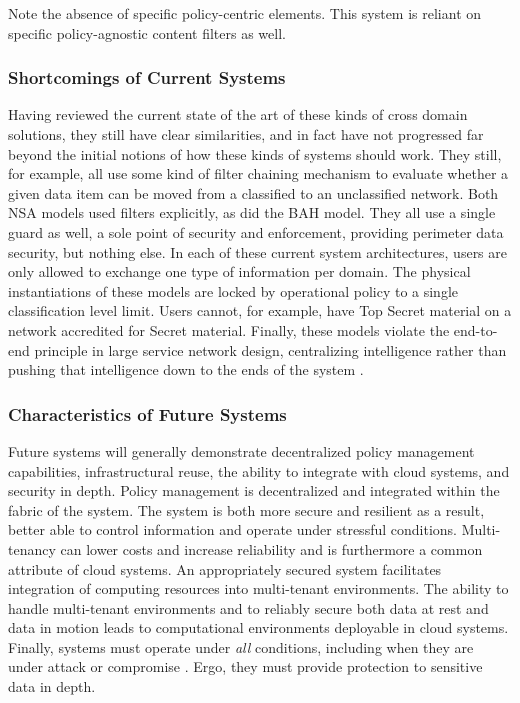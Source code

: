 \documentclass[12pt,letterpaper]{article}
\begin{document}
Note the absence of specific policy-centric elements.  This system is reliant on specific policy-agnostic content filters as well.

\subsubsection{Shortcomings of Current Systems}
Having reviewed the current state of the art of these kinds of cross domain solutions,  they still have clear similarities, and in fact have not progressed far beyond the initial notions of how these kinds of systems should work.  They still, for example, all use some kind of filter chaining mechanism to evaluate whether a given data item can be moved from a classified to an unclassified network.  Both NSA models used filters explicitly, as did the BAH model.  They all use a single guard as well, a sole point of security and enforcement, providing perimeter data security, but nothing else.  In each of these current system architectures, users are only allowed to exchange one type of information per domain.  The physical instantiations of these models are locked by operational policy to a single classification level limit.  Users cannot, for example, have Top Secret material on a network accredited for Secret material.  Finally, these models violate the end-to-end principle in large service network design, centralizing intelligence rather than pushing that intelligence down to the ends of the system \cite{Blumenthal:2001:RDI:383034.383037}.

\subsubsection{Characteristics of Future Systems}
Future systems will generally demonstrate decentralized policy management capabilities, infrastructural reuse, the ability to integrate with cloud systems, and security in depth.  Policy management is decentralized and integrated within the fabric of the system.  The system is both more secure and resilient as a result, better able to control information and operate under stressful conditions.  Multi-tenancy can lower costs and increase reliability and is furthermore a common attribute of cloud systems.  An appropriately secured system facilitates integration of computing resources into multi-tenant environments.  The ability to handle multi-tenant environments and to reliably secure both data at rest and data in motion leads to computational environments deployable in cloud systems.  Finally, systems must operate under \textit{all} conditions, including when they are under attack or compromise \cite{proposal:ron-ross}.  Ergo, they must provide protection to sensitive data in depth.
\end{document}
